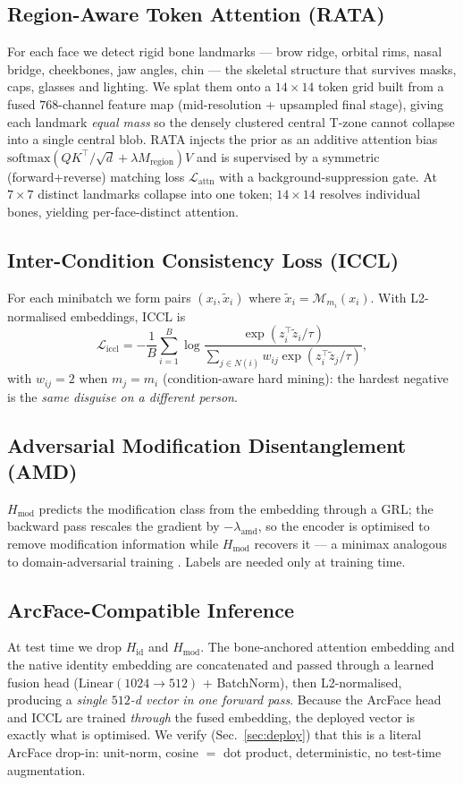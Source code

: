 \documentclass[10pt,conference]{IEEEtran}
\begin{document}
\subsection{Region-Aware Token Attention (RATA)}
For each face we detect rigid bone landmarks --- brow ridge, orbital rims,
nasal bridge, cheekbones, jaw angles, chin --- the skeletal structure that
survives masks, caps, glasses and lighting. We splat them onto a $14{\times}14$
token grid built from a fused $768$-channel feature map (mid-resolution +
upsampled final stage), giving each landmark \emph{equal mass} so the densely
clustered central T-zone cannot collapse into a single central blob. RATA
injects the prior as an additive attention bias
$\mathrm{softmax}(QK^{\!\top}\!/\sqrt{d} + \lambda M_{\text{region}})V$ and is
supervised by a symmetric (forward+reverse) matching loss
$\mathcal{L}_{\text{attn}}$ with a background-suppression gate. At $7{\times}7$
distinct landmarks collapse into one token; $14{\times}14$ resolves individual
bones, yielding per-face-distinct attention.

\subsection{Inter-Condition Consistency Loss (ICCL)}
For each minibatch we form pairs $(x_i,\tilde{x}_i)$ where
$\tilde{x}_i\!=\!\mathcal{M}_{m_i}(x_i)$. With L2-normalised embeddings, ICCL is
\begin{equation}
\mathcal{L}_{\text{iccl}} = -\frac{1}{B}\sum_{i=1}^{B}
\log\frac{\exp(z_i^{\!\top}\tilde{z}_i/\tau)}
        {\sum_{j\in N(i)} w_{ij}\exp(z_i^{\!\top}\tilde{z}_j/\tau)},
\end{equation}
with $w_{ij}\!=\!2$ when $m_j\!=\!m_i$ (condition-aware hard mining): the
hardest negative is the \emph{same disguise on a different person}.

\subsection{Adversarial Modification Disentanglement (AMD)}
$H_{\text{mod}}$ predicts the modification class from the embedding through a
GRL; the backward pass rescales the gradient by $-\lambda_{\text{amd}}$, so the
encoder is optimised to remove modification information while $H_{\text{mod}}$
recovers it --- a minimax analogous to domain-adversarial training
\cite{ganin2015dann}. Labels are needed only at training time.

\subsection{ArcFace-Compatible Inference}
At test time we drop $H_{\text{id}}$ and $H_{\text{mod}}$. The bone-anchored
attention embedding and the native identity embedding are concatenated and
passed through a learned fusion head ($\mathrm{Linear}(1024\!\to\!512)$ +
BatchNorm), then L2-normalised, producing a \emph{single $512$-d vector in one
forward pass}. Because the ArcFace head and ICCL are trained \emph{through} the
fused embedding, the deployed vector is exactly what is optimised. We verify
(Sec.~\ref{sec:deploy}) that this is a literal ArcFace drop-in: unit-norm,
cosine $=$ dot product, deterministic, no test-time augmentation.
\end{document}

